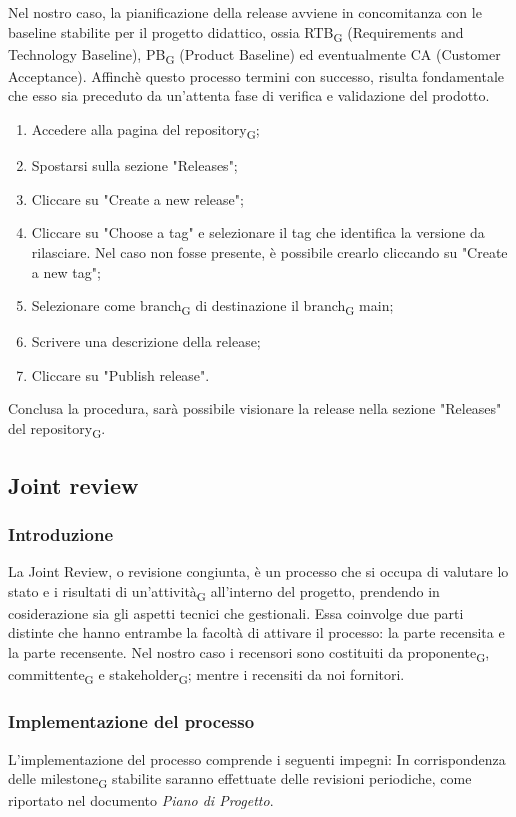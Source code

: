 Nel nostro caso, la pianificazione della release avviene in concomitanza con le baseline stabilite per il progetto didattico, ossia 
{RTB\textsubscript{G}} (Requirements and Technology Baseline), 
{PB\textsubscript{G}} (Product Baseline) ed eventualmente CA (Customer Acceptance).
Affinchè questo processo termini con successo, risulta fondamentale che esso sia preceduto da un'attenta fase di verifica e validazione del prodotto.

\begin{enumerate}
    \item Accedere alla pagina del {repository\textsubscript{G}};
    \item Spostarsi sulla sezione "Releases";
    \item Cliccare su "Create a new release";
    \item Cliccare su "Choose a tag" e selezionare il tag che identifica la versione da rilasciare. Nel caso non fosse presente, è possibile
    crearlo cliccando su "Create a new tag";
    \item Selezionare come {branch\textsubscript{G}} di destinazione il {branch\textsubscript{G}} main;
    \item Scrivere una descrizione della release;
    \item Cliccare su "Publish release".
\end{enumerate}
Conclusa la procedura, sarà possibile visionare la release nella sezione "Releases" del {repository\textsubscript{G}}.

\subsection{Joint review}
\subsubsection{Introduzione}
La Joint Review, o revisione congiunta, è un processo che si occupa di valutare lo stato e i risultati di un'{attività\textsubscript{G}}
all'interno del progetto, prendendo in cosiderazione sia gli aspetti tecnici che gestionali. Essa coinvolge due parti distinte che hanno entrambe
la facoltà di attivare il processo: la parte recensita e la parte recensente. Nel nostro caso i recensori sono costituiti da
{proponente\textsubscript{G}}, {committente\textsubscript{G}} e {stakeholder\textsubscript{G}};
mentre i recensiti da noi fornitori.

\subsubsection{Implementazione del processo}
L'implementazione del processo comprende i seguenti impegni:
In corrispondenza delle {milestone\textsubscript{G}} stabilite saranno effettuate delle revisioni periodiche, come riportato nel
documento \textit{Piano di Progetto}.

